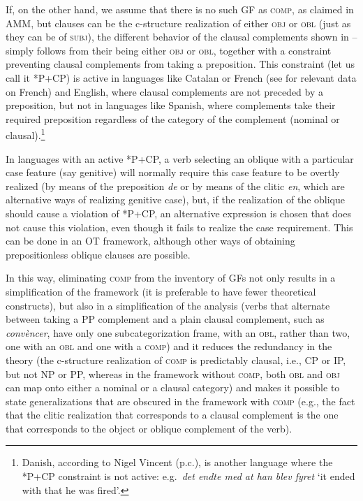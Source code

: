 \documentclass[output=paper,hidelinks]{langscibook}
\begin{document}
If, on the other hand, we assume that there is no such GF as \textsc{comp}, as claimed in AMM, but clauses can be the c-structure realization of either \textsc{obj} or \textsc{obl} (just as they can be of \textsc{subj}), the different behavior of the clausal complements shown in -- simply follows from their being either \textsc{obj} or \textsc{obl}, together with a constraint preventing clausal complements from taking a preposition. This constraint (let us call it *P+CP) is active in languages like Catalan or French (see \citealt{forst06} for relevant data on French) and English, where clausal complements are not preceded by a preposition, but not in languages like Spanish, where complements take their required preposition regardless of the category of the complement (nominal or clausal).\footnote{Danish, according to Nigel Vincent (p.c.), is another language where the *P+CP constraint is not active: e.g.\ \textit{det endte med at han blev fyret} `it ended with that he was fired'.}

In languages with an active *P+CP, a verb selecting an oblique with a particular case feature (say genitive) will normally require this case feature to be overtly realized (by means of the preposition \textit{de} or by means of the clitic \textit{en}, which are alternative ways of realizing genitive case), but, if the realization of the oblique should cause a violation of *P+CP, an alternative expression is chosen that does not cause this violation, even though it fails to realize the case requirement. This can be done in an OT framework, although other ways of obtaining prepositionless oblique clauses are possible.

In this way, eliminating \textsc{comp} from the inventory of GFs not only results in a simplification of the framework (it is preferable to have fewer theoretical constructs), but also in a simplification of the analysis (verbs that alternate between taking a PP complement and a plain clausal complement, such as \textit{convèncer}, have only one subcategorization frame, with an \textsc{obl}, rather than two, one with an \textsc{obl} and one with a \textsc{comp}) and it reduces the redundancy in the theory (the c-structure realization of \textsc{comp} is predictably clausal, i.e., CP or IP, but not NP or PP, whereas in the framework without \textsc{comp}, both \textsc{obl} and \textsc{obj} can map onto either a nominal or a clausal category) and makes it possible to state generalizations that are obscured in the framework with \textsc{comp} (e.g., the fact that the clitic realization that corresponds to a clausal complement is the one that corresponds to the object or oblique complement of the verb).
\end{document}
